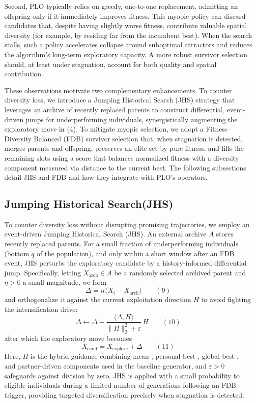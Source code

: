 \documentclass[3p]{elsarticle}
\begin{document}
Second, PLO typically relies on greedy, one-to-one replacement, admitting an offspring only if it immediately improves fitness. This myopic policy can discard candidates that, despite having slightly worse fitness, contribute valuable spatial diversity (for example, by residing far from the incumbent best). When the search stalls, such a policy accelerates collapse around suboptimal attractors and reduces the algorithm's long-term exploratory capacity. A more robust survivor selection should, at least under stagnation, account for both quality and spatial contribution.

These observations motivate two complementary enhancements. To counter diversity loss, we introduce a Jumping Historical Search (JHS) strategy that leverages an archive of recently replaced parents to construct differential, event-driven jumps for underperforming individuals, synergistically augmenting the exploratory move in (4). To mitigate myopic selection, we adopt a Fitness–Diversity Balanced (FDB) survivor selection that, when stagnation is detected, merges parents and offspring, preserves an elite set by pure fitness, and fills the remaining slots using a score that balances normalized fitness with a diversity component measured via distance to the current best. The following subsections detail JHS and FDB and how they integrate with PLO's operators.

\subsection{Jumping Historical Search(JHS)}
To counter diversity loss without disrupting promising trajectories, we employ an event-driven Jumping Historical Search (JHS). An external archive \(A\) stores recently replaced parents. For a small fraction of underperforming individuals (bottom \(q\) of the population), and only within a short window after an FDB event, JHS perturbs the exploratory candidate by a history-informed differential jump. Specifically, letting \(X_{\!\text{arch}}\in A\) be a randomly selected archived parent and \(\eta>0\) a small magnitude, we form
\[ \Delta = \eta\,\bigl(X_i - X_{\!\text{arch}}\bigr) \qquad(9) \]
and orthogonalize it against the current exploitation direction \(H\) to avoid fighting the intensification drive:
\[ \Delta \leftarrow \Delta - \frac{\langle \Delta, H \rangle}{\lVert H \rVert_2^2 + \varepsilon}\,H \qquad(10) \]
after which the exploratory move becomes
\[ X_{\mathrm{cand}} = X_{\mathrm{explore}} + \Delta \qquad(11) \]
Here, \(H\) is the hybrid guidance combining mean-, personal-best-, global-best-, and partner-driven components used in the baseline generator, and \(\varepsilon>0\) safeguards against division by zero. JHS is applied with a small probability to eligible individuals during a limited number of generations following an FDB trigger, providing targeted diversification precisely when stagnation is detected.
\end{document}
